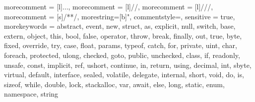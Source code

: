 \usepackage{listings, xcolor}


{
 morecomment = [l]{...},
 morecomment = [l]{//}, 
 morecomment = [l]{///},
 morecomment = [s]{/*}{*/},
 morestring=[b]", 
 commentstyle=\color{emerald}\ttfamily,
 sensitive = true,
 morekeywords = {abstract,  event,  new,  struct,
   as,  explicit,  null,  switch,
   base,  extern,  object,  this,
   bool,  false,  operator,  throw,
   break,  finally,  out,  true,
   byte,  fixed,  override,  try,
   case,  float,  params,  typeof,
   catch,  for,  private,  uint,
   char,  foreach,  protected,  ulong,
   checked,  goto,  public,  unchecked,
   class,  if,  readonly,  unsafe,
   const,  implicit,  ref,  ushort,
   continue,  in,  return,  using,
   decimal,  int,  sbyte,  virtual,
   default,  interface,  sealed,  volatile,
   delegate,  internal,  short,  void,
   do,  is,  sizeof,  while,
   double,  lock,  stackalloc, var, await,  
   else,  long,  static,   
   enum,  namespace,  string}
}

